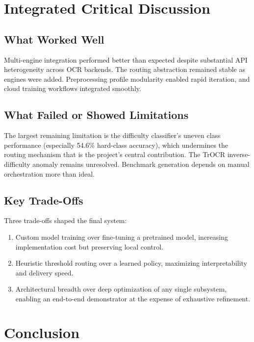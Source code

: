 \documentclass[12pt,a4paper]{article}
\begin{document}
\newpage

\section{Integrated Critical Discussion}

\subsection{What Worked Well}

Multi-engine integration performed better than expected despite
substantial API heterogeneity across OCR backends. The routing
abstraction remained stable as engines were added. Preprocessing
profile modularity enabled rapid iteration, and cloud training
workflows integrated smoothly.

\subsection{What Failed or Showed Limitations}

The largest remaining limitation is the difficulty classifier's
uneven class performance (especially 54.6\% hard-class accuracy),
which undermines the routing mechanism that is the project's central
contribution. The TrOCR inverse-difficulty anomaly
remains unresolved. Benchmark generation depends on manual
orchestration more than ideal.

\subsection{Key Trade-Offs}

Three trade-offs shaped the final system:
\begin{enumerate}
  \item Custom model training over fine-tuning a pretrained model,
    increasing implementation cost but preserving local control.
  \item Heuristic threshold routing over a learned policy, maximizing
    interpretability and delivery speed.
  \item Architectural breadth over deep optimization of any single
    subsystem, enabling an end-to-end demonstrator at the expense of
    exhaustive refinement.
\end{enumerate}

\newpage

\section{Conclusion}
\end{document}
